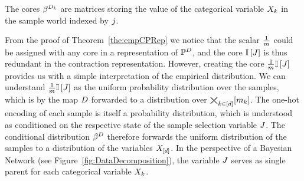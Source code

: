The cores $\beta^{D_{k}}$ are matrices storing the value of the categorical variable $X_{k}$ in the sample world indexed by $j$.

From the proof of Theorem~\ref{the:empCPRep} we notice that the scalar $\frac{1}{m}$ could be assigned with any core in a representation of $\mathbb{P}^{D}$, and the core $\mathbb{I}\left[J\right]$ is thus redundant in the contraction representation.
However, creating the core $\frac{1}{m}\mathbb{I}\left[J\right]$ provides us with a simple interpretation of the empirical distribution.
We can understand $\frac{1}{m}\mathbb{I}\left[J\right]$ as the uniform probability distribution over the samples, which is by the map $D$ forwarded to a distribution over $\bigtimes_{k\in[d]}[m_{k}]$.
The one-hot encoding of each sample is itself a probability distribution, which is understood as conditioned on the respective state of the sample selection variable $J$.
The conditional distribution $\beta^{D}$ therefore forwards the uniform distribution of the samples to a distribution of the variables $X_{[d]}$.
In the perspective of a Bayesian Network (see Figure~\ref{fig:DataDecomposition}), the variable $J$ serves as single parent for each categorical variable $X_{k}$.





